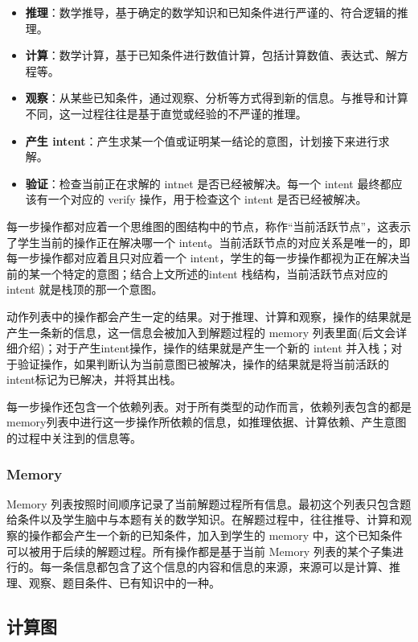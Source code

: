 \begin{itemize}
    \item \textbf{推理}：数学推导，基于确定的数学知识和已知条件进行严谨的、符合逻辑的推理。
    \item \textbf{计算}：数学计算，基于已知条件进行数值计算，包括计算数值、表达式、解方程等。
    \item \textbf{观察}：从某些已知条件，通过观察、分析等方式得到新的信息。与推导和计算不同，这一过程往往是基于直觉或经验的不严谨的推理。
    \item \textbf{产生 intent}：产生求某一个值或证明某一结论的意图，计划接下来进行求解。
    \item \textbf{验证}：检查当前正在求解的 intnet 是否已经被解决。每一个 intent 最终都应该有一个对应的 verify 操作，用于检查这个 intent 是否已经被解决。
\end{itemize}

每一步操作都对应着一个思维图的图结构中的节点，称作“当前活跃节点”，这表示了学生当前的操作正在解决哪一个 intent。当前活跃节点的对应关系是唯一的，即每一步操作都对应着且只对应着一个 intent，学生的每一步操作都视为正在解决当前的某一个特定的意图；结合上文所述的intent 栈结构，当前活跃节点对应的 intent 就是栈顶的那一个意图。

动作列表中的操作都会产生一定的结果。对于推理、计算和观察，操作的结果就是产生一条新的信息，这一信息会被加入到解题过程的 memory 列表里面(后文会详细介绍)；对于产生intent操作，操作的结果就是产生一个新的 intent 并入栈；对于验证操作，如果判断认为当前意图已被解决，操作的结果就是将当前活跃的intent标记为已解决，并将其出栈。

每一步操作还包含一个依赖列表。对于所有类型的动作而言，依赖列表包含的都是memory列表中进行这一步操作所依赖的信息，如推理依据、计算依赖、产生意图的过程中关注到的信息等。

\subsubsection*{Memory}

Memory 列表按照时间顺序记录了当前解题过程所有信息。最初这个列表只包含题给条件以及学生脑中与本题有关的数学知识。在解题过程中，往往推导、计算和观察的操作都会产生一个新的已知条件，加入到学生的 memory 中，这个已知条件可以被用于后续的解题过程。所有操作都是基于当前 Memory 列表的某个子集进行的。每一条信息都包含了这个信息的内容和信息的来源，来源可以是计算、推理、观察、题目条件、已有知识中的一种。

\subsection{计算图}

